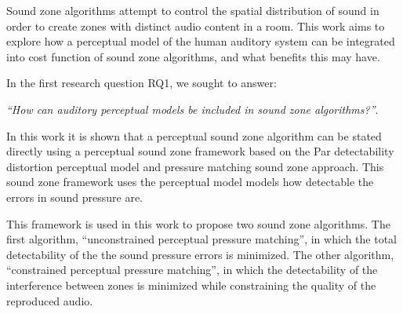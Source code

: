 Sound zone algorithms attempt to control the spatial distribution of sound 
in order to create zones with distinct audio content in a room.
This work aims to explore how a perceptual model of the human auditory system can be integrated into 
cost function of sound zone algorithms, and what benefits this may have.

In the first research question RQ1, we sought to answer:
\begin{center}
    {\textit{``How can auditory perceptual models be included in sound zone algorithms?''}}.\\
\end{center}
In this work it is shown that a perceptual sound zone algorithm can be stated directly using a perceptual sound 
zone framework based on the Par detectability distortion perceptual model and pressure matching sound zone approach.
This sound zone framework uses the perceptual model models how detectable the errors in sound pressure are.

This framework is used in this work to propose two sound zone algorithms.
The first algorithm, ``unconstrained perceptual pressure matching'', 
in which the total detectability of the the sound pressure errors is minimized.
The other algorithm, ``constrained perceptual pressure matching'', in which the
detectability of the interference between zones is minimized while constraining the quality of the reproduced audio.


